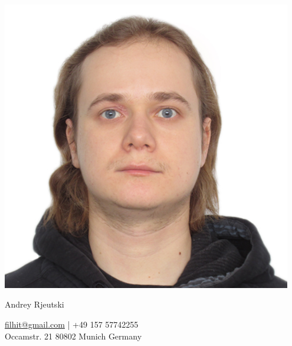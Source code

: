 \documentclass[a4paper]{article}
\begin{document}
  \begin{minipage}{0.3\textwidth}
    \includegraphics[width=0.95\textwidth]{photo}
  \end{minipage}
  \begin{minipage}{0.69\textwidth}
    \begin{centering}
      {\Huge Andrey Rjeutski}

      \href{mailto:filhit@gmail.com}{filhit@gmail.com} | +49 157 57742255\\
      Occamstr. 21 80802 Munich Germany
	  
	\end{centering}
  \end{minipage}
  
\end{document}

